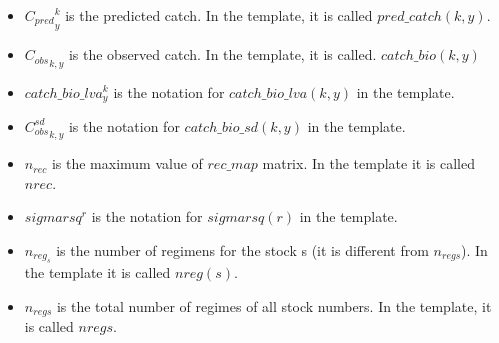 \documentclass{article}
\begin{document}
\begin{itemize}
    \item ${C_{pred}}^{k}_y$ is the predicted catch. In the template, it is called $pred\_catch(k,y)$.
    \item ${C_{obs}}_{k,y}$ is the observed catch. In the template, it is called. $catch\_bio(k,y)$ 
    \item $catch\_bio\_lva^k_y$ is the notation for  $catch\_bio\_lva(k,y)$ in the template.
    \item ${C^{sd}_{obs}}_{k,y}$ is the notation for $catch\_bio\_sd(k,y)$ in the template.
    \item $n_{rec}$ is the maximum value of $rec\_map$ matrix. In the template it is called $nrec$.
    \item $sigmarsq^r$ is the notation for $sigmarsq(r)$ in the template.
    
    \item $n_{reg_s}$ is the number of regimens for the stock s (it is different from $n_{regs}$). In the template it is called $nreg(s)$.
    

    \item $n_{regs}$ is the total number of regimes of all stock numbers. In the template, it is called 
    $nregs$.
    
    

\end{itemize}
\end{document}
